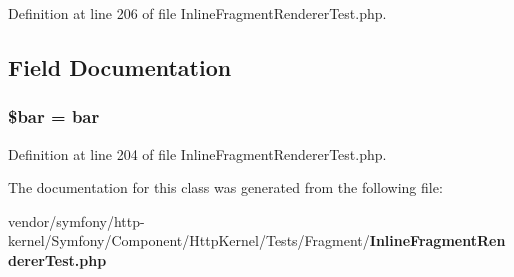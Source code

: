 Definition at line 206 of file Inline\+Fragment\+Renderer\+Test.\+php.



\subsection{Field Documentation}
\subsubsection[{\$bar}]{\setlength{\rightskip}{0pt plus 5cm}\$bar = \textquotesingle{}bar\textquotesingle{}}\label{class_symfony_1_1_component_1_1_http_kernel_1_1_tests_1_1_fragment_1_1_bar_ab669d165b99e23bf90d68a0a057f69ac}


Definition at line 204 of file Inline\+Fragment\+Renderer\+Test.\+php.



The documentation for this class was generated from the following file\+:\begin{DoxyCompactItemize}
\item 
vendor/symfony/http-\/kernel/\+Symfony/\+Component/\+Http\+Kernel/\+Tests/\+Fragment/{\bf Inline\+Fragment\+Renderer\+Test.\+php}\end{DoxyCompactItemize}
